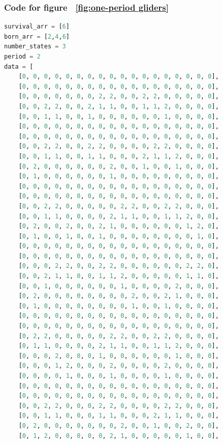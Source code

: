 \documentclass[12pt]{article}
\numberwithin{figure}{section} %
\begin{document}
\subsubsection{Code for figure ~\ref{fig:one-period gliders}}
\label{subsubsection:one-period gliders}
\begin{lstlisting}[language = Python]
survival_arr = [6]
born_arr = [2,4,6]
number_states = 3
period = 2
data = [
    [0, 0, 0, 0, 0, 0, 0, 0, 0, 0, 0, 0, 0, 0, 0, 0, 0, 0],
    [0, 0, 0, 0, 0, 0, 0, 0, 0, 0, 0, 0, 0, 0, 0, 0, 0, 0],
    [0, 0, 0, 0, 0, 0, 0, 2, 2, 0, 0, 2, 2, 0, 0, 0, 0, 0],
    [0, 0, 2, 2, 0, 0, 2, 1, 1, 0, 0, 1, 1, 2, 0, 0, 0, 0],
    [0, 0, 1, 1, 0, 0, 1, 0, 0, 0, 0, 0, 0, 1, 0, 0, 0, 0],
    [0, 0, 0, 0, 0, 0, 0, 0, 0, 0, 0, 0, 0, 0, 0, 0, 0, 0],
    [0, 0, 0, 0, 0, 0, 0, 0, 0, 0, 0, 0, 0, 0, 0, 0, 0, 0],
    [0, 0, 2, 2, 0, 0, 2, 2, 0, 0, 0, 0, 2, 2, 0, 0, 0, 0],
    [0, 0, 1, 1, 0, 0, 1, 1, 0, 0, 0, 2, 1, 1, 2, 0, 0, 0],
    [0, 2, 0, 0, 0, 0, 0, 0, 2, 0, 0, 1, 0, 0, 1, 0, 0, 0],
    [0, 1, 0, 0, 0, 0, 0, 0, 1, 0, 0, 0, 0, 0, 0, 0, 0, 0],
    [0, 0, 0, 0, 0, 0, 0, 0, 0, 0, 0, 0, 0, 0, 0, 0, 0, 0],
    [0, 0, 0, 0, 0, 0, 0, 0, 0, 0, 0, 0, 0, 0, 0, 0, 0, 0],
    [0, 0, 2, 2, 0, 0, 0, 0, 0, 2, 2, 0, 0, 2, 2, 0, 0, 0],
    [0, 0, 1, 1, 0, 0, 0, 0, 2, 1, 1, 0, 0, 1, 1, 2, 0, 0],
    [0, 2, 0, 0, 2, 0, 0, 2, 1, 0, 0, 0, 0, 0, 0, 1, 2, 0],
    [0, 1, 0, 0, 1, 0, 0, 1, 0, 0, 0, 0, 0, 0, 0, 0, 1, 0],
    [0, 0, 0, 0, 0, 0, 0, 0, 0, 0, 0, 0, 0, 0, 0, 0, 0, 0],
    [0, 0, 0, 0, 0, 0, 0, 0, 0, 0, 0, 0, 0, 0, 0, 0, 0, 0],
    [0, 0, 0, 2, 2, 0, 0, 2, 2, 0, 0, 0, 0, 0, 0, 2, 2, 0],
    [0, 0, 2, 1, 1, 0, 0, 1, 1, 2, 0, 0, 0, 0, 0, 1, 1, 0],
    [0, 0, 1, 0, 0, 0, 0, 0, 0, 1, 0, 0, 0, 0, 2, 0, 0, 0],
    [0, 2, 0, 0, 0, 0, 0, 0, 0, 0, 2, 0, 0, 2, 1, 0, 0, 0],
    [0, 1, 0, 0, 0, 0, 0, 0, 0, 0, 1, 0, 0, 1, 0, 0, 0, 0],
    [0, 0, 0, 0, 0, 0, 0, 0, 0, 0, 0, 0, 0, 0, 0, 0, 0, 0],
    [0, 0, 0, 0, 0, 0, 0, 0, 0, 0, 0, 0, 0, 0, 0, 0, 0, 0],    
    [0, 2, 2, 0, 0, 0, 0, 0, 2, 2, 0, 0, 2, 2, 0, 0, 0, 0],
    [0, 1, 1, 0, 0, 0, 0, 2, 1, 1, 0, 0, 1, 1, 2, 0, 0, 0],
    [0, 0, 0, 2, 0, 0, 0, 1, 0, 0, 0, 0, 0, 0, 1, 0, 0, 0],
    [0, 0, 0, 1, 2, 0, 0, 0, 2, 0, 0, 0, 0, 2, 0, 0, 0, 0],
    [0, 0, 0, 0, 1, 0, 0, 0, 1, 0, 0, 0, 0, 1, 0, 0, 0, 0],
    [0, 0, 0, 0, 0, 0, 0, 0, 0, 0, 0, 0, 0, 0, 0, 0, 0, 0],
    [0, 0, 0, 0, 0, 0, 0, 0, 0, 0, 0, 0, 0, 0, 0, 0, 0, 0],  
    [0, 0, 2, 2, 0, 0, 0, 2, 2, 0, 0, 0, 0, 2, 2, 0, 0, 0],
    [0, 0, 1, 1, 0, 0, 0, 1, 1, 0, 0, 0, 2, 1, 1, 0, 0, 0],
    [0, 2, 0, 0, 0, 0, 0, 0, 0, 2, 0, 0, 1, 0, 0, 2, 0, 0],
    [0, 1, 2, 0, 0, 0, 0, 0, 2, 1, 0, 0, 0, 0, 0, 1, 0, 0],

\end{lstlisting}
\end{document}
